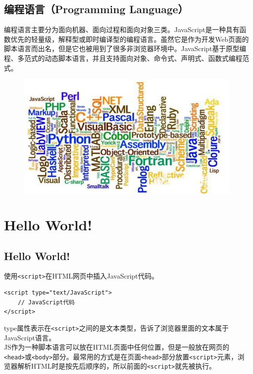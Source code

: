 \subsection{编程语言（Programming Language）}

编程语言主要分为面向机器、面向过程和面向对象三类。JavaScript是一种具有函数优先的轻量级，解释型或即时编译型的编程语言。虽然它是作为开发Web页面的脚本语言而出名，但是它也被用到了很多非浏览器环境中。JavaScript基于原型编程、多范式的动态脚本语言，并且支持面向对象、命令式、声明式、函数式编程范式。

\begin{figure}[H]
	\centering
	\includegraphics[scale=0.9]{img/C9/9-1/1.png}
\end{figure}

\section{Hello World!}

\subsection{Hello World!}

使用\lstinline|<script>|在HTML网页中插入JavaScript代码。 \\

\begin{lstlisting}[style=htmlcssjs]
<script type="text/JavaScript">
    // JavaScript代码
</script>
\end{lstlisting}

type属性表示在\lstinline|<script>|之间的是文本类型，告诉了浏览器里面的文本属于JavaScript语言。 \\

JS作为一种脚本语言可以放在HTML页面中任何位置，但是一般放在网页的\lstinline|<head>|或\lstinline|<body>|部分。最常用的方式是在页面\lstinline|<head>|部分放置\lstinline|<script>|元素，浏览器解析HTML时是按先后顺序的，所以前面的\lstinline|<script>|就先被执行。 \\

